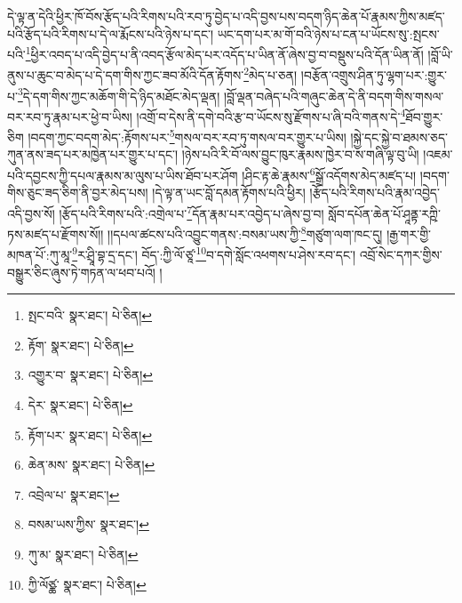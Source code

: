 དེ་ལྟ་ན་དེའི་ཕྱིར་ཁོ་བོས་རྩོད་པའི་རིགས་པའི་རབ་ཏུ་བྱེད་པ་འདི་བྱས་པས་བདག་ཉིད་ཆེན་པོ་རྣམས་ཀྱིས་མཛད་པའི་རྩོད་པའི་རིགས་པ་དེ་ལ་རྨོངས་པའི་ཉེས་པ་དང་། ཡང་དག་པར་མ་གོ་བའི་ཉེས་པ་ངན་པ་ཡོངས་སུ་:སྤངས་པའི་\footnote{སྤང་བའི་  སྣར་ཐང་།  པེ་ཅིན། }ཕྱིར་འབད་པ་འདི་བྱེད་པ་ནི་འབད་རྩོལ་མེད་པར་འདོད་པ་ཡིན་ནོ་ཞེས་བྱ་བ་བསྡུས་པའི་དོན་ཡིན་ནོ། །བློ་ཡི་ནུས་པ་ཆུང་བ་མེད་པ་དེ་དག་གིས་ཀྱང་ཟབ་མོའི་དོན་རྟོགས་\footnote{རྟོག་  སྣར་ཐང་།  པེ་ཅིན། }མེད་པ་ཅན། །བརྩོན་འགྲུས་ཤིན་ཏུ་ལྷག་པར་:གྱུར་པ་\footnote{འགྱུར་བ་  སྣར་ཐང་།  པེ་ཅིན། }དེ་དག་གིས་ཀྱང་མཆོག་གི་དེ་ཉིད་མཐོང་མེད་ལྡན། །བློ་ལྡན་བཞེད་པའི་གཞུང་ཆེན་དེ་ནི་བདག་གིས་གསལ་བར་རབ་ཏུ་རྣམ་པར་ཕྱེ་བ་ཡིས། །འགྲོ་བ་དེས་ནི་དགེ་བའི་རྩ་བ་ཡོངས་སུ་རྫོགས་པ་ཞི་བའི་གནས་དེ་\footnote{དེར་  སྣར་ཐང་།  པེ་ཅིན། }ཐོབ་གྱུར་ཅིག །བདག་ཀྱང་བདག་མེད་:རྟོགས་པར་\footnote{རྟོག་པར་  སྣར་ཐང་།  པེ་ཅིན། }གསལ་བར་རབ་ཏུ་གསལ་བར་གྱུར་པ་ཡིས། །སྐྱེ་དང་སྐྱེ་བ་ཐམས་ཅད་ཀུན་ནས་ཟད་པར་མཁྱེན་པར་གྱུར་པ་དང་། །ཉེས་པའི་རི་བོ་ལས་བྱུང་ཁུར་རྣམས་ཁྱེར་བ་ས་གཞི་ལྟ་བུ་ཡི། །འཇམ་པའི་དབྱངས་ཀྱི་དཔལ་རྣམས་མ་ལུས་པ་ཡིས་ཐོབ་པར་ཤོག །ཤིང་རྟ་ཆེ་རྣམས་\footnote{ཆེན་མས་  སྣར་ཐང་།  པེ་ཅིན། }སྒྲོ་འདོགས་མེད་མཛད་པ། །བདག་གིས་ཅུང་ཟད་ཅིག་ནི་བྱར་མེད་པས། །དེ་ལྟ་ན་ཡང་བློ་དམན་རྟོགས་པའི་ཕྱིར། །རྩོད་པའི་རིགས་པའི་རྣམ་འབྱེད་འདི་བྱས་སོ། །རྩོད་པའི་རིགས་པའི་:འགྲེལ་པ་\footnote{འབྲེལ་པ་  སྣར་ཐང་། }དོན་རྣམ་པར་འབྱེད་པ་ཞེས་བྱ་བ། སློབ་དཔོན་ཆེན་པོ་ཤཱནྟ་རཀྵི་ཏས་མཛད་པ་རྫོགས་སོ།། །།དཔལ་ཚངས་པའི་འབྱུང་གནས་:བསམ་ཡས་ཀྱི་\footnote{བསམ་ཡས་ཀྱིས་  སྣར་ཐང་། }གཙུག་ལག་ཁང་དུ། །རྒྱ་གར་གྱི་མཁན་པོ་:ཀུ་མཱ་\footnote{ཀུ་མ་  སྣར་ཐང་།  པེ་ཅིན། }ར་ཤྲཱི་བྷ་དྲ་དང་། བོད་:ཀྱི་ལོ་ཙཱ་\footnote{ཀྱི་ལོཙྪ་  སྣར་ཐང་།  པེ་ཅིན། }བ་དགེ་སློང་འཕགས་པ་ཤེས་རབ་དང་། འབྲོ་སེང་དཀར་གྱིས་བསྒྱུར་ཅིང་ཞུས་ཏེ་གཏན་ལ་ཕབ་པའོ། ། 